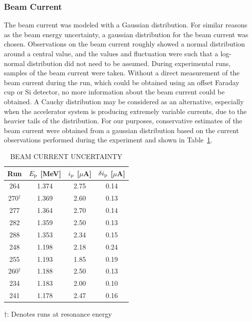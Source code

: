 \subsubsection{Beam Current}
The beam current was modeled with a Gaussian distribution. For similar
reasons as the beam energy uncertainty, a gaussian distribution for the
beam current was chosen. Observations on the beam current roughly showed
a normal distribution around a central value, and the values and
fluctuation were such that a log-normal distribution did not need to be
assumed. During experimental runs, samples of the beam current were
taken. Without a direct measurement of the beam current during the run,
which could be obtained using an offset Faraday cup or Si detector, no
more information about the beam current could be obtained. A Cauchy
distribution may be considered as an alternative, especially when the
accelerator system is producing extremely variable currents, due to the
heavier tails of the distribution. For our purposes, conservative
estimates of the beam current were obtained from a gaussian distribution
based on the current observations performed during the experiment and
shown in Table~\ref{tab:beam-current-uncertainty}.

\begin{table}[h]
    \begin{center}
        \caption{BEAM CURRENT UNCERTAINTY}
        \label{tab:beam-current-uncertainty}
        \begin{tabular}{cccc}
            \toprule
            \midrule
            \textbf{Run} & \textbf{$E_{\rm p}$ [MeV]} & \textbf{$i_{\rm
                p}$ [$\mu$A]} & \textbf{$\delta i_{\rm p}$ [$\mu$A]} \\
            \midrule
                264           & 1.374 & 2.75 & 0.14 \\
                270$^\dagger$ & 1.369 & 2.60 & 0.13 \\
                277           & 1.364 & 2.70 & 0.14 \\
                282           & 1.359 & 2.50 & 0.13 \\
                288           & 1.353 & 2.34 & 0.15 \\
                248           & 1.198 & 2.18 & 0.24 \\
                255           & 1.193 & 1.85 & 0.19 \\
                260$^\dagger$ & 1.188 & 2.50 & 0.13 \\
                234           & 1.183 & 2.00 & 0.10 \\
                241           & 1.178 & 2.47 & 0.16 \\
            \bottomrule
        \end{tabular}

        \vspace{0.5em}
        $\dagger$: Denotes runs at resonance energy
    \end{center}
\end{table}

